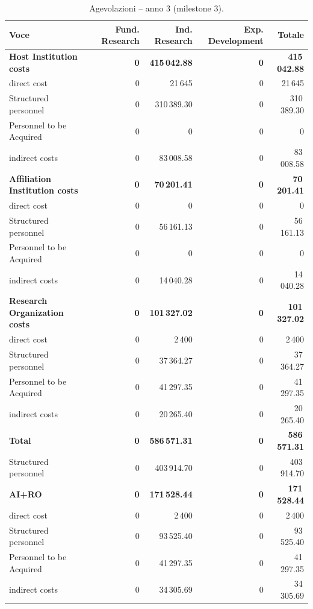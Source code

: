 \documentclass{plan4ari_report}
\begin{document}
\begin{table}[H]\centering\small
\caption{Agevolazioni -- anno 3 (milestone 3).}\label{tab:bpy-a-y3}
\begin{tabular}{lrrrr}\toprule
\textbf{Voce} & \textbf{Fund. Research} & \textbf{Ind. Research} & \textbf{Exp. Development} & \textbf{Totale} \\\midrule
\textbf{Host Institution costs} & \textbf{0} & \textbf{415\,042.88} & \textbf{0} & \textbf{415\,042.88} \\
\quad direct cost & 0 & 21\,645 & 0 & 21\,645 \\
\quad Structured personnel & 0 & 310\,389.30 & 0 & 310\,389.30 \\
\quad Personnel to be Acquired & 0 & 0 & 0 & 0 \\
\quad indirect costs & 0 & 83\,008.58 & 0 & 83\,008.58 \\
\textbf{Affiliation Institution costs} & \textbf{0} & \textbf{70\,201.41} & \textbf{0} & \textbf{70\,201.41} \\
\quad direct cost & 0 & 0 & 0 & 0 \\
\quad Structured personnel & 0 & 56\,161.13 & 0 & 56\,161.13 \\
\quad Personnel to be Acquired & 0 & 0 & 0 & 0 \\
\quad indirect costs & 0 & 14\,040.28 & 0 & 14\,040.28 \\
\textbf{Research Organization costs} & \textbf{0} & \textbf{101\,327.02} & \textbf{0} & \textbf{101\,327.02} \\
\quad direct cost & 0 & 2\,400 & 0 & 2\,400 \\
\quad Structured personnel & 0 & 37\,364.27 & 0 & 37\,364.27 \\
\quad Personnel to be Acquired & 0 & 41\,297.35 & 0 & 41\,297.35 \\
\quad indirect costs & 0 & 20\,265.40 & 0 & 20\,265.40 \\
\midrule
\textbf{Total} & \textbf{0} & \textbf{586\,571.31} & \textbf{0} & \textbf{586\,571.31} \\
\quad Structured personnel & 0 & 403\,914.70 & 0 & 403\,914.70 \\
\textbf{AI+RO} & \textbf{0} & \textbf{171\,528.44} & \textbf{0} & \textbf{171\,528.44} \\
\quad direct cost & 0 & 2\,400 & 0 & 2\,400 \\
\quad Structured personnel & 0 & 93\,525.40 & 0 & 93\,525.40 \\
\quad Personnel to be Acquired & 0 & 41\,297.35 & 0 & 41\,297.35 \\
\quad indirect costs & 0 & 34\,305.69 & 0 & 34\,305.69 \\
\bottomrule\end{tabular}
\end{table}
\end{document}
